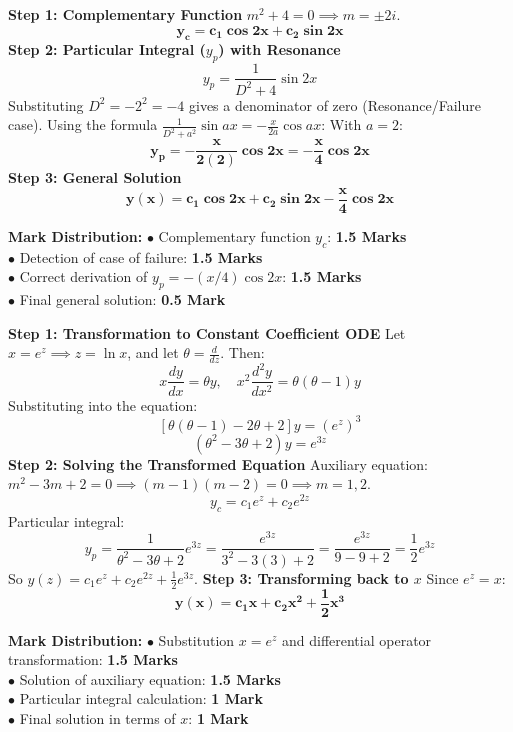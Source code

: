 \begin{solutionbox}
\textbf{Step 1: Complementary Function}
$m^2 + 4 = 0 \implies m = \pm 2i$.
\[
\mathbf{y_c = c_1 \cos 2x + c_2 \sin 2x}
\]
\textbf{Step 2: Particular Integral ($y_p$) with Resonance}
\[
y_p = \frac{1}{D^2 + 4} \sin 2x
\]
Substituting $D^2 = -2^2 = -4$ gives a denominator of zero (Resonance/Failure case).
Using the formula $\frac{1}{D^2 + a^2}\sin ax = -\frac{x}{2a}\cos ax$:
With $a = 2$:
\[
\mathbf{y_p = -\frac{x}{2(2)}\cos 2x = -\frac{x}{4}\cos 2x}
\]
\textbf{Step 3: General Solution}
\[
\mathbf{y(x) = c_1 \cos 2x + c_2 \sin 2x - \frac{x}{4}\cos 2x}
\]

\begin{markingrubric}
\textbf{Mark Distribution:}
$\bullet$ Complementary function $y_c$: \textbf{1.5 Marks}\\
$\bullet$ Detection of case of failure: \textbf{1.5 Marks}\\
$\bullet$ Correct derivation of $y_p = -(x/4)\cos 2x$: \textbf{1.5 Marks}\\
$\bullet$ Final general solution: \textbf{0.5 Mark}
\end{markingrubric}
\end{solutionbox}

\begin{solutionbox}
\textbf{Step 1: Transformation to Constant Coefficient ODE}
Let $x = e^z \implies z = \ln x$, and let $\theta = \frac{d}{dz}$.
Then:
\[
x \frac{dy}{dx} = \theta y, \quad x^2 \frac{d^2 y}{dx^2} = \theta(\theta - 1)y
\]
Substituting into the equation:
\[
[\theta(\theta - 1) - 2\theta + 2]y = (e^z)^3
\]
\[
(\theta^2 - 3\theta + 2)y = e^{3z}
\]
\textbf{Step 2: Solving the Transformed Equation}
Auxiliary equation: $m^2 - 3m + 2 = 0 \implies (m - 1)(m - 2) = 0 \implies m = 1, 2$.
\[
y_c = c_1 e^z + c_2 e^{2z}
\]
Particular integral:
\[
y_p = \frac{1}{\theta^2 - 3\theta + 2} e^{3z} = \frac{e^{3z}}{3^2 - 3(3) + 2} = \frac{e^{3z}}{9 - 9 + 2} = \frac{1}{2} e^{3z}
\]
So $y(z) = c_1 e^z + c_2 e^{2z} + \frac{1}{2}e^{3z}$.
\textbf{Step 3: Transforming back to $x$}
Since $e^z = x$:
\[
\mathbf{y(x) = c_1 x + c_2 x^2 + \frac{1}{2} x^3}
\]

\begin{markingrubric}
\textbf{Mark Distribution:}
$\bullet$ Substitution $x = e^z$ and differential operator transformation: \textbf{1.5 Marks}\\
$\bullet$ Solution of auxiliary equation: \textbf{1.5 Marks}\\
$\bullet$ Particular integral calculation: \textbf{1 Mark}\\
$\bullet$ Final solution in terms of $x$: \textbf{1 Mark}
\end{markingrubric}
\end{solutionbox}

